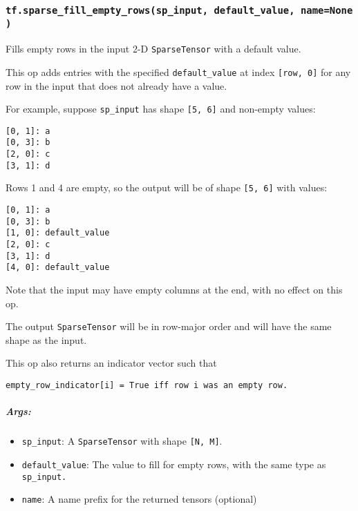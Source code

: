 \subsubsection{\texorpdfstring{\texttt{tf.sparse\_fill\_empty\_rows(sp\_input,\ default\_value,\ name=None)}
}{tf.sparse\_fill\_empty\_rows(sp\_input, default\_value, name=None) }}\label{tf.sparseux5ffillux5femptyux5frowsspux5finput-defaultux5fvalue-namenone}

Fills empty rows in the input 2-D \texttt{SparseTensor} with a default
value.

This op adds entries with the specified \texttt{default\_value} at index
\texttt{{[}row,\ 0{]}} for any row in the input that does not already
have a value.

For example, suppose \texttt{sp\_input} has shape \texttt{{[}5,\ 6{]}}
and non-empty values:

\begin{verbatim}
[0, 1]: a
[0, 3]: b
[2, 0]: c
[3, 1]: d
\end{verbatim}

Rows 1 and 4 are empty, so the output will be of shape
\texttt{{[}5,\ 6{]}} with values:

\begin{verbatim}
[0, 1]: a
[0, 3]: b
[1, 0]: default_value
[2, 0]: c
[3, 1]: d
[4, 0]: default_value
\end{verbatim}

Note that the input may have empty columns at the end, with no effect on
this op.

The output \texttt{SparseTensor} will be in row-major order and will
have the same shape as the input.

This op also returns an indicator vector such that

\begin{verbatim}
empty_row_indicator[i] = True iff row i was an empty row.
\end{verbatim}

\subparagraph{Args: }\label{args-7}

\begin{itemize}
\tightlist
\item
  \texttt{sp\_input}: A \texttt{SparseTensor} with shape
  \texttt{{[}N,\ M{]}}.
\item
  \texttt{default\_value}: The value to fill for empty rows, with the
  same type as \texttt{sp\_input.}
\item
  \texttt{name}: A name prefix for the returned tensors (optional)
\end{itemize}

